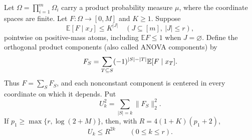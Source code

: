 \begin{lemma}\label{sampling:low-levels}
Let $\Omega=\prod_{i=1}^m\Omega_i$ carry a product probability measure $\mu$,
where the coordinate spaces are finite. Let $F:\Omega\to[0,M]$ and $K\ge1$.
Suppose
\[
  \mathbb E[F\mid x_J]\le K^{|J|}
       \quad (J\subseteq[m],\ |J|\le r),
\]
pointwise on positive-mass atoms, including $\mathbb EF\le1$ when $J=\varnothing$.
Define the orthogonal product components (also called ANOVA components) by
\[
 F_S=\sum_{T\subseteq S}(-1)^{|S|-|T|}\mathbb E[F\mid x_T].
\]
Thus $F=\sum_SF_S$, and each nonconstant component is centered in every
coordinate on which it depends. Put
\[
 U_k^2=\sum_{|S|=k}\|F_S\|_2^2.
\]
If $p_1\ge\max\{r,\log(2+M)\}$, then, with
$R=4(1+K)(p_1+2)$,
\[
 U_k\le R^{2k}\qquad(0\le k\le r).
\]
\end{lemma}

